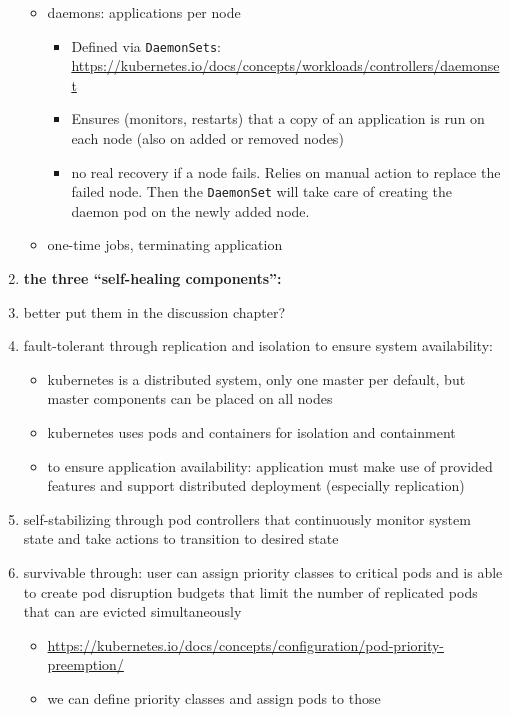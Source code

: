 \begin{enumerate}
\begin{itemize}
            \item daemons: applications per node
              \begin{itemize}
                \item Defined via \texttt{DaemonSets}: \url{https://kubernetes.io/docs/concepts/workloads/controllers/daemonset}
                \item Ensures (monitors, restarts) that a copy of an application is run on each node (also on added or removed nodes)
                \item no real recovery if a node fails. Relies on manual action to replace the failed node. Then the \texttt{DaemonSet} will take care of creating the daemon pod on the newly added node.
              \end{itemize}
            \item one-time jobs, terminating application
          \end{itemize}
    \item \textbf{the three \enquote{self-healing components}:}
    \item better put them in the discussion chapter?
    \item fault-tolerant through replication and isolation to ensure system availability:
      \begin{itemize}
      \item \gls{kubernetes} is a distributed system, only one master per default, but master components can be placed on all nodes
      \item \gls{kubernetes} uses pods and containers for isolation and containment
      \item to ensure application availability: application must make use of provided features and support distributed deployment (especially replication)
    \end{itemize}
    \item self-stabilizing through pod controllers that continuously monitor system state and take actions to transition to desired state
    \item survivable through: user can assign priority classes to critical pods and is able to create pod disruption budgets that limit the number of replicated pods that can are evicted simultaneously
      \begin{itemize}
        \item \url{https://kubernetes.io/docs/concepts/configuration/pod-priority-preemption/}
        \item we can define priority classes and assign pods to those

\end{itemize}
\end{enumerate}

